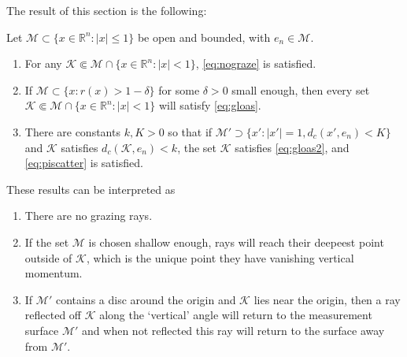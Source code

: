 \documentclass[
	fontsize=11pt, 
	twoside=false, 
	abstract=true, 
	a4paper,
]{scrartcl}
\newcommand{\RR}{\mathbb{R}}
\newcommand{\abs}[1]{\left\lvert#1\right\rvert}
\begin{document}
The result of this section is the following:
\begin{lemma}
	Let $\mathcal{M} \subset \{x\in \RR^n\colon \abs{x}\leq 1\}$ be open and bounded, with $e_n \in\mathcal{M}$.  
\begin{enumerate}
	\item For any $\mathcal{K} \Subset \mathcal{M} \cap \{x\in \RR^n\colon \abs{x} < 1\}$, \cref{eq:nograze} is satisfied. 
	\item If $\mathcal{M} \subset \{x\colon r(x)>1-\delta\}$ for some $\delta >0$ small enough, then every set $\mathcal{K}\Subset\mathcal{M}\cap \{x\in \RR^n\colon \abs{x} < 1\}$ will satisfy \cref{eq:gloas}.
	\item There are constants $k,K>0$ so that if $\mathcal{M}' \supset \{x'\colon \abs{x'}=1, d_c(x',e_n) < K\}$ and $\mathcal{K}$ satisfies $d_c(\mathcal{K},e_n) < k$, the set $\mathcal{K}$ satisfies \cref{eq:gloas2}, and \cref{eq:piscatter} is satisfied.
\end{enumerate}
\end{lemma}
These results can be interpreted as
\begin{enumerate}
	\item There are no grazing rays.
	\item If the set $\mathcal{M}$ is chosen shallow enough, rays will reach their deepeest point outside of $\mathcal{K}$, which is the unique point they have vanishing vertical momentum.
	\item If $\mathcal{M}'$ contains a disc around the origin and $\mathcal{K}$ lies near the origin, then a ray reflected off $\mathcal{K}$ along the `vertical' angle will return to the measurement surface $\mathcal{M}'$ and when not reflected this ray will return to the surface away from $\mathcal{M}'$.
\end{enumerate}
\end{document}
